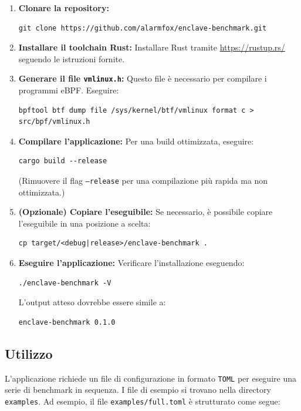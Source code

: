 \documentclass{article}
\begin{document}
\begin{enumerate}
  \item \textbf{Clonare la repository:}
  \begin{verbatim}
git clone https://github.com/alarmfox/enclave-benchmark.git
  \end{verbatim}

  \item \textbf{Installare il toolchain Rust:} Installare Rust tramite \url{https://rustup.rs/} seguendo le istruzioni fornite.

  \item \textbf{Generare il file \texttt{vmlinux.h}:} Questo file è necessario per compilare i programmi eBPF. Eseguire:
  \begin{verbatim}
bpftool btf dump file /sys/kernel/btf/vmlinux format c > src/bpf/vmlinux.h
  \end{verbatim}

  \item \textbf{Compilare l'applicazione:} Per una build ottimizzata, eseguire:
  \begin{verbatim}
cargo build --release
  \end{verbatim}
  (Rimuovere il flag \texttt{--release} per una compilazione più rapida ma non ottimizzata.)

  \item \textbf{(Opzionale) Copiare l'eseguibile:} Se necessario, è possibile copiare l'eseguibile in una posizione a scelta:
  \begin{verbatim}
cp target/<debug|release>/enclave-benchmark .
  \end{verbatim}

  \item \textbf{Eseguire l'applicazione:} Verificare l'installazione eseguendo:
  \begin{verbatim}
./enclave-benchmark -V
  \end{verbatim}
  L'output atteso dovrebbe essere simile a:
  \begin{verbatim}
enclave-benchmark 0.1.0
  \end{verbatim}
\end{enumerate}

\subsection{Utilizzo}
L'applicazione richiede un file di configurazione in formato \texttt{TOML} per eseguire una serie di benchmark in sequenza. I file di esempio si trovano nella directory \texttt{examples}. Ad esempio, il file \texttt{examples/full.toml} è strutturato come segue:
\end{document}
